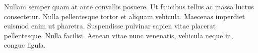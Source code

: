 \documentclass[12pt]{diazessay} %
\begin{document}
Nullam semper quam at ante convallis posuere. Ut faucibus tellus ac massa luctus consectetur. Nulla pellentesque tortor et aliquam vehicula. Maecenas imperdiet euismod enim ut pharetra. Suspendisse pulvinar sapien vitae placerat pellentesque. Nulla facilisi. Aenean vitae nunc venenatis, vehicula neque in, congue ligula.







\end{document}
